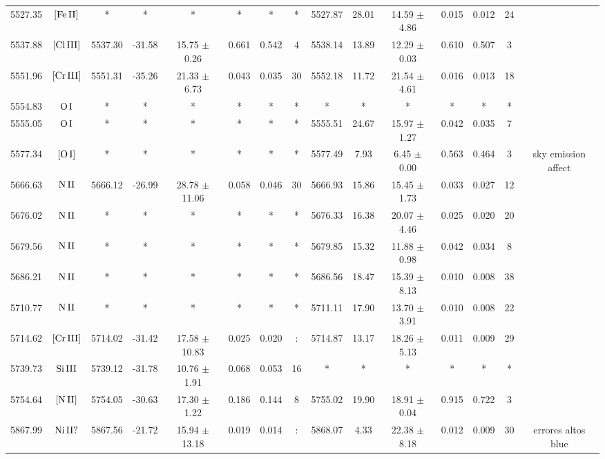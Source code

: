 \documentclass{article}
\begin{document}
\begin{table*}
\begin{adjustbox}{width=\textwidth}
\begin{tabular}{ccccccccccccccc}
5527.35 & $\mbox{[Fe}\thinspace \mbox{II]}$ & * & * & * & * & * & * & 5527.87 & 28.01 & 14.59 $\pm$ 4.86 & 0.015 & 0.012 & 24 &  \\
5537.88 & $\mbox{[Cl}\thinspace \mbox{III]}$ & 5537.30 & -31.58 & 15.75 $\pm$ 0.26 & 0.661 & 0.542 & 4 & 5538.14 & 13.89 & 12.29 $\pm$ 0.03 & 0.610 & 0.507 & 3 &  \\
5551.96 & $\mbox{[Cr}\thinspace \mbox{III]}$ & 5551.31 & -35.26 & 21.33 $\pm$ 6.73 & 0.043 & 0.035 & 30 & 5552.18 & 11.72 & 21.54 $\pm$ 4.61 & 0.016 & 0.013 & 18 &  \\
5554.83 & $\mbox{O}\thinspace \mbox{I}$ & * & * & * & * & * & * & * & * & * & * & * & * &  \\
5555.05 & $\mbox{O}\thinspace \mbox{I}$ & * & * & * & * & * & * & 5555.51 & 24.67 & 15.97 $\pm$ 1.27 & 0.042 & 0.035 & 7 &  \\
5577.34 & $\mbox{[O}\thinspace \mbox{I]}$ & * & * & * & * & * & * & 5577.49 & 7.93 & 6.45 $\pm$ 0.00 & 0.563 & 0.464 & 3 &  sky emission affect \\
5666.63 & $\mbox{N}\thinspace \mbox{II}$ & 5666.12 & -26.99 & 28.78 $\pm$ 11.06 & 0.058 & 0.046 & 30 & 5666.93 & 15.86 & 15.45 $\pm$ 1.73 & 0.033 & 0.027 & 12 &  \\
5676.02 & $\mbox{N}\thinspace \mbox{II}$ & * & * & * & * & * & * & 5676.33 & 16.38 & 20.07 $\pm$ 4.46 & 0.025 & 0.020 & 20 &  \\
5679.56 & $\mbox{N}\thinspace \mbox{II}$ & * & * & * & * & * & * & 5679.85 & 15.32 & 11.88 $\pm$ 0.98 & 0.042 & 0.034 & 8 &  \\
5686.21 & $\mbox{N}\thinspace \mbox{II}$ & * & * & * & * & * & * & 5686.56 & 18.47 & 15.39 $\pm$ 8.13 & 0.010 & 0.008 & 38 &  \\
5710.77 & $\mbox{N}\thinspace \mbox{II}$ & * & * & * & * & * & * & 5711.11 & 17.90 & 13.70 $\pm$ 3.91 & 0.010 & 0.008 & 22 &  \\
5714.62 & $\mbox{[Cr}\thinspace \mbox{III]}$ & 5714.02 & -31.42 & 17.58 $\pm$ 10.83 & 0.025 & 0.020 & : & 5714.87 & 13.17 & 18.26 $\pm$ 5.13 & 0.011 & 0.009 & 29 &  \\
5739.73 & $\mbox{Si}\thinspace \mbox{III}$ & 5739.12 & -31.78 & 10.76 $\pm$ 1.91 & 0.068 & 0.053 & 16 & * & * & * & * & * & * &  \\
5754.64 & $\mbox{[N}\thinspace \mbox{II]}$ & 5754.05 & -30.63 & 17.30 $\pm$ 1.22 & 0.186 & 0.144 & 8 & 5755.02 & 19.90 & 18.91 $\pm$ 0.04 & 0.915 & 0.722 & 3 &  \\
5867.99 & $\mbox{Ni}\thinspace \mbox{II?}$ & 5867.56 & -21.72 & 15.94 $\pm$ 13.18 & 0.019 & 0.014 & : & 5868.07 & 4.33 & 22.38 $\pm$ 8.18 & 0.012 & 0.009 & 30 &  errores altos blue \\

\end{tabular}
\end{adjustbox}
\end{table*}
\end{document}
